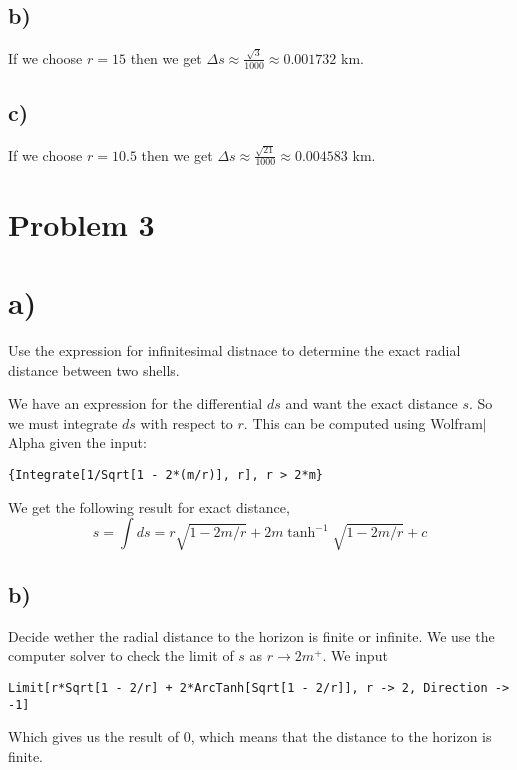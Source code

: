 \documentclass{article}
\theoremstyle{definition}
\begin{document}
\subsection*{b)}
If we choose $r = 15$ then we get $\Delta s \approx \frac{\sqrt{3}}{1000} \approx 0.001732$ km.
\subsection*{c)}
If we choose $r = 10.5$ then we get $\Delta s \approx \frac{\sqrt{21}}{1000} \approx 0.004583$ km.
\section*{Problem 3}
\section*{a)}
\begin{mdframed}
    Use the expression for infinitesimal distnace to determine the exact radial distance between two shells.
\end{mdframed}
We have an expression for the differential $ds$ and want the exact distance $s$. So we must integrate $ds$ with respect to $r$.
This can be computed using Wolfram$|$Alpha given the input:
\begin{verbatim}
{Integrate[1/Sqrt[1 - 2*(m/r)], r], r > 2*m}
\end{verbatim}
We get the following result for exact distance,
\[
    s = \int ds = r \sqrt{1-2m/r} + 2m \tanh^{-1}\sqrt{1- 2m/r} + c
\]
\subsection*{b)}
Decide wether the radial distance to the horizon is finite or infinite.
We use the computer solver to check the limit of $s$ as $r \rightarrow 2m^{+}$.
We input
\begin{verbatim}
Limit[r*Sqrt[1 - 2/r] + 2*ArcTanh[Sqrt[1 - 2/r]], r -> 2, Direction -> -1]
\end{verbatim}
Which gives us the result of 0, which means that the distance to the horizon is finite.
\end{document}
